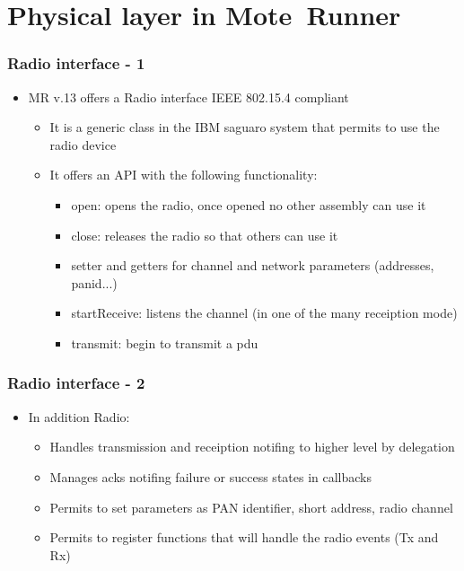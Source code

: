 \section{Physical layer in \mbox{Mote Runner}}
\begin{frame}[fragile]
  \frametitle{Radio interface - 1}
  \begin{itemize}
    \item MR v.13 offers a Radio interface IEEE 802.15.4 compliant
    \begin{itemize}
    	\item It is a generic class in the IBM saguaro system that permits to use the radio device
    	\item It offers an API with the following functionality:
    	\begin{itemize}
			\item open: opens the radio, once opened no other assembly can use it
			\item close: releases the radio so that others can use it
			\item setter and getters for channel and network parameters (addresses, panid...)
			\item startReceive: listens the channel (in one of the many receiption mode)
			\item transmit: begin to transmit a pdu
    	\end{itemize}
    \end{itemize}
  \end{itemize}
\end{frame}

\begin{frame}[fragile]
	\frametitle{Radio interface - 2}
	\begin{itemize}
		\item In addition Radio:
		\begin{itemize}
			\item Handles transmission and receiption notifing to higher level by delegation
			\item Manages acks notifing failure or success states in callbacks
			\item Permits to set parameters as PAN identifier, short address, radio channel
			\item Permits to register functions that will handle the radio events (Tx and Rx)
		\end{itemize}
	\end{itemize}
\end{frame}



